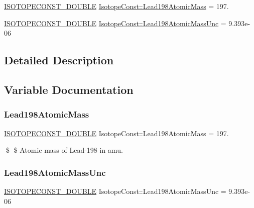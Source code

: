 \begin{DoxyCompactItemize}
\item 
\mbox{\hyperlink{group___isotope_const-_macros_ga8f45a7272ce02c0b4c65c44636ed719a}{I\+S\+O\+T\+O\+P\+E\+C\+O\+N\+S\+T\+\_\+\+D\+O\+U\+B\+LE}} \mbox{\hyperlink{group___isotope_const-_lead-_pb198_gaa9f1f8bc26e4aaccd1ff891da2d18ecd}{Isotope\+Const\+::\+Lead198\+Atomic\+Mass}} = 197.
\item 
\mbox{\hyperlink{group___isotope_const-_macros_ga8f45a7272ce02c0b4c65c44636ed719a}{I\+S\+O\+T\+O\+P\+E\+C\+O\+N\+S\+T\+\_\+\+D\+O\+U\+B\+LE}} \mbox{\hyperlink{group___isotope_const-_lead-_pb198_ga244fed17ff3a28d70b27f30b154cef85}{Isotope\+Const\+::\+Lead198\+Atomic\+Mass\+Unc}} = 9.\+393e-\/06
\end{DoxyCompactItemize}


\subsection{Detailed Description}


\subsection{Variable Documentation}
\mbox{\label{group___isotope_const-_lead-_pb198_gaa9f1f8bc26e4aaccd1ff891da2d18ecd}} 
\subsubsection{\texorpdfstring{Lead198\+Atomic\+Mass}{Lead198AtomicMass}}
{\footnotesize\ttfamily \mbox{\hyperlink{group___isotope_const-_macros_ga8f45a7272ce02c0b4c65c44636ed719a}{I\+S\+O\+T\+O\+P\+E\+C\+O\+N\+S\+T\+\_\+\+D\+O\+U\+B\+LE}} Isotope\+Const\+::\+Lead198\+Atomic\+Mass = 197.}

\$ \$ Atomic mass of Lead-\/198 in amu. \mbox{\label{group___isotope_const-_lead-_pb198_ga244fed17ff3a28d70b27f30b154cef85}} 
\subsubsection{\texorpdfstring{Lead198\+Atomic\+Mass\+Unc}{Lead198AtomicMassUnc}}
{\footnotesize\ttfamily \mbox{\hyperlink{group___isotope_const-_macros_ga8f45a7272ce02c0b4c65c44636ed719a}{I\+S\+O\+T\+O\+P\+E\+C\+O\+N\+S\+T\+\_\+\+D\+O\+U\+B\+LE}} Isotope\+Const\+::\+Lead198\+Atomic\+Mass\+Unc = 9.\+393e-\/06}

